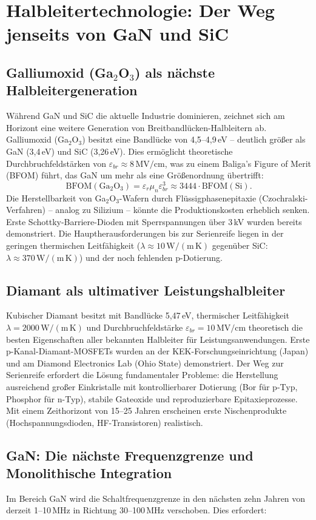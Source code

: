 ﻿\documentclass[a4paper,12pt,openany,oneside]{book}
\newcommand{\abschnitt}[1]{\section{#1}}
\newcommand{\unterabschnitt}[1]{\subsection{#1}}
\theoremstyle{definition}
\begin{document}
\abschnitt{Halbleitertechnologie: Der Weg jenseits von GaN und SiC}

\unterabschnitt{Galliumoxid (Ga$_2$O$_3$) als n\"achste Halbleitergener\-ation}

W\"ahrend GaN und SiC die aktuelle Industrie dominieren, zeichnet sich am Horizont eine
weitere Generation von Breitbandl\"ucken-Halbleitern ab. Galliumoxid (Ga$_2$O$_3$) besitzt
eine Bandl\"ucke von 4{,}5--4{,}9\,eV -- deutlich gr\"o\ss{}er als GaN (3{,}4\,eV) und SiC
(3{,}26\,eV). Dies erm\"oglicht theoretische Durchbruchfeldst\"arken von $\varepsilon_{br}
\approx 8\,\mathrm{MV/cm}$, was zu einem Baliga's Figure of Merit (BFOM) f\"uhrt, das GaN
um mehr als eine Gr\"o\ss{}enordnung \"ubertrifft:
\[
  \mathrm{BFOM}(\mathrm{Ga_2O_3}) = \varepsilon_r \mu_n \varepsilon_{br}^3
  \approx 3444 \cdot \mathrm{BFOM}(\mathrm{Si}).
\]
Die Herstellbarkeit von Ga$_2$O$_3$-Wafern durch Fl\"ussigphasenepitaxie (Czochralski-
Verfahren) -- analog zu Silizium -- k\"onnte die Produktionskosten erheblich senken.
Erste Schottky-Barriere-Dioden mit Sperrspannungen \"uber 3\,kV wurden bereits demonstriert.
Die Hauptherausforderungen bis zur Serienreife liegen in der geringen thermischen
Leitf\"ahigkeit ($\lambda \approx 10\,\mathrm{W/(m\,K)}$ gegen\"uber SiC:
$\lambda \approx 370\,\mathrm{W/(m\,K)}$) und der noch fehlenden p-Dotierung.

\unterabschnitt{Diamant als ultimativer Leistungshalbleiter}

Kubischer Diamant besitzt mit Bandl\"ucke 5{,}47\,eV, thermischer Leitf\"ahigkeit
$\lambda = 2000\,\mathrm{W/(m\,K)}$ und Durchbruchfeldst\"arke $\varepsilon_{br} =
10\,\mathrm{MV/cm}$ theoretisch die besten Eigenschaften aller bekannten Halbleiter f\"ur
Leistungsanwendungen. Erste p-Kanal-Diamant-MOSFETs wurden an der KEK-Forschungseinrichtung
(Japan) und am Diamond Electronics Lab (Ohio State) demonstriert. Der Weg zur Serienreife
erfordert die L\"osung fundamentaler Probleme: die Herstellung ausreichend gro\ss{}er
Einkristalle mit kontrollierbarer Dotierung (Bor f\"ur p-Typ, Phosphor f\"ur n-Typ),
stabile Gateoxide und reproduzierbare Epitaxieprozesse. Mit einem Zeithorizont von
15--25 Jahren erscheinen erste Nischenprodukte (Hochspannungsdioden, HF-Transistoren)
realistisch.

\unterabschnitt{GaN: Die n\"achste Frequenzgrenze und Monolithische Integration}

Im Bereich GaN wird die Schaltfrequenzgrenze in den n\"achsten zehn Jahren von derzeit
1--10\,MHz in Richtung 30--100\,MHz verschoben. Dies erfordert:
\end{document}
